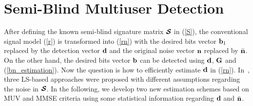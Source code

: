 \documentclass[a4paper,10pt,fleqn, twocolumn]{IEEETran}
\newcommand{\bb}{{\bf b}}
\newcommand{\bd}{{\bf d}}
\newcommand{\bG}{{\bf G}}
\newcommand{\bn}{{\bf n}}
\newcommand{\bcS}{{\mbox {\boldmath ${\cal S}$}}}
\begin{document}
\section{Semi-Blind Multiuser Detection}
After defining the known semi-blind signature matrix $\bcS$ in
(\ref{S}), the conventional signal model (\ref{r}) is transformed
into (\ref{rn}) with the desired bits vector $\bb_1$ replaced by
the detection vector $\bd$ and the original noise vector $\bn$
replaced by $\bar{\bn}$. On the other hand, the desired bits
vector $\bb$ can be detected using $\bd$, $\bG$ and
(\ref{bn_estimation}). Now the question is how to efficiently
estimate $\bd$ in (\ref{rn}). In~\cite{Wang03d,Wang03e}, three
LS-based approaches were proposed with different assumptions
regarding the noise in $\bcS$. In the following, we develop two
new estimation schemes based on MUV and MMSE criteria using some
statistical information regarding $\bd$ and $\bar\bn$.
\end{document}
